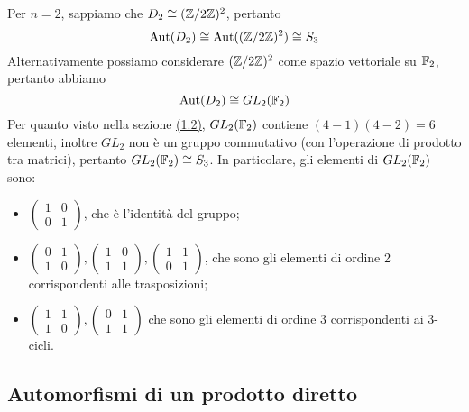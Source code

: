 \documentclass[11pt]{scrartcl}
\begin{document}
Per $n = 2$, sappiamo che $D_2 \cong (\mathbb{Z}/{2}\mathbb{Z})^2$, pertanto 
\[
    \operatorname{Aut}(D_2) \cong \operatorname{Aut}((\mathbb{Z}/{2}\mathbb{Z})^2) \cong S_3
\]
Alternativamente possiamo considerare $(\mathbb{Z}/{2}\mathbb{Z})^2$ come spazio vettoriale su $\mathbb F_2$,
pertanto abbiamo 
\[
    \operatorname{Aut}(D_2) \cong GL_2(\mathbb F_2)
\]Per quanto visto nella sezione \hyperref[sez 1.2]{(1.2)}, $GL_2(\mathbb F_2)$ 
contiene $(4 - 1)(4 - 2) = 6$ elementi, inoltre $GL_2$ non è un gruppo 
commutativo (con l'operazione di prodotto tra matrici), pertanto $GL_2(\mathbb F_2) \cong S_3$.
In particolare, gli elementi di $GL_2(\mathbb F_2)$ sono:
\begin{itemize}
    \item $\begin{pmatrix}
    1 & 0\\
    0 & 1
    \end{pmatrix}$, che è l'identità del gruppo;
    \item $\begin{pmatrix}
    0 & 1\\
    1 & 0
    \end{pmatrix}, \begin{pmatrix}
        1 & 0\\
        1 & 1
    \end{pmatrix}, \begin{pmatrix}
        1 & 1\\
        0 & 1
    \end{pmatrix}$, che sono gli elementi di ordine 2 corrispondenti alle 
    trasposizioni;
    \item $\begin{pmatrix}
    1 & 1\\
    1 & 0
    \end{pmatrix}, \begin{pmatrix}
        0 & 1\\
        1 & 1
    \end{pmatrix}$ che sono gli elementi di ordine $3$ corrispondenti ai $3$-cicli.
\end{itemize}

\newpage

\subsection{Automorfismi di un prodotto diretto}
\end{document}
